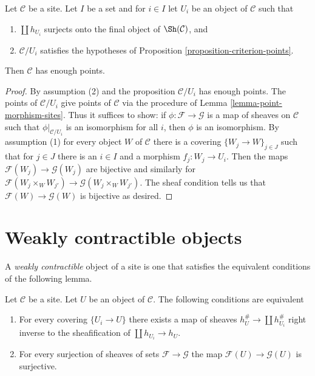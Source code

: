 \begin{lemma}
\label{lemma-criterion-points}
Let $\mathcal{C}$ be a site. Let $I$ be a set and for
$i \in I$ let $U_i$ be an object of $\mathcal{C}$ such that
\begin{enumerate}
\item $\coprod h_{U_i}$ surjects onto
the final object of $\Sh(\mathcal{C})$, and
\item $\mathcal{C}/U_i$ satisfies the hypotheses of
Proposition \ref{proposition-criterion-points}.
\end{enumerate}
Then $\mathcal{C}$ has enough points.
\end{lemma}

\begin{proof}
By assumption (2) and the proposition $\mathcal{C}/U_i$ has enough points.
The points of $\mathcal{C}/U_i$ give points of $\mathcal{C}$
via the procedure of Lemma \ref{lemma-point-morphism-sites}.
Thus it suffices to show: if $\phi : \mathcal{F} \to \mathcal{G}$
is a map of sheaves on $\mathcal{C}$ such that $\phi|_{\mathcal{C}/U_i}$
is an isomorphism for all $i$, then $\phi$ is an isomorphism.
By assumption (1) for every object $W$ of $\mathcal{C}$
there is a covering $\{W_j \to W\}_{j \in J}$
such that for $j \in J$ there is an $i \in I$ and a morphism
$f_j : W_j \to U_i$. Then the maps
$\mathcal{F}(W_j) \to \mathcal{G}(W_j)$
are bijective and similarly for
$\mathcal{F}(W_j \times_W W_{j'}) \to \mathcal{G}(W_j \times_W W_{j'})$.
The sheaf condition tells us that $\mathcal{F}(W) \to \mathcal{G}(W)$
is bijective as desired.
\end{proof}




\section{Weakly contractible objects}
\label{section-w-contractible}

\noindent
A {\it weakly contractible} object of a site is one that satisfies
the equivalent conditions of the following lemma.

\begin{lemma}
\label{lemma-w-contractible}
Let $\mathcal{C}$ be a site. Let $U$ be an object of $\mathcal{C}$.
The following conditions are equivalent
\begin{enumerate}
\item For every covering $\{U_i \to U\}$ there exists a map of
sheaves $h_U^\# \to \coprod h_{U_i}^\#$ right inverse to the sheafification
of $\coprod h_{U_i} \to h_U$.
\item For every surjection of sheaves of sets $\mathcal{F} \to \mathcal{G}$
the map $\mathcal{F}(U) \to \mathcal{G}(U)$ is surjective.
\end{enumerate}
\end{lemma}

